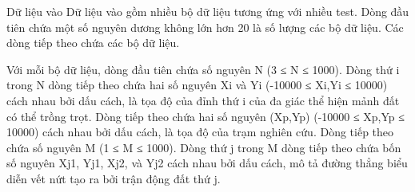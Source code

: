 Dữ liệu vào
Dữ liệu vào gồm nhiều bộ dữ liệu tương ứng với nhiều test. Dòng đầu tiên chứa một số nguyên dương không lớn hơn 20 là số lượng các bộ dữ liệu. Các dòng tiếp theo chứa các bộ dữ liệu.  

   Với mỗi bộ dữ liệu, dòng đầu tiên chứa số nguyên N (3 ≤  N ≤  1000). Dòng thứ i trong N dòng tiếp theo chứa hai số nguyên Xi và Yi (-10000 ≤ Xi,Yi ≤ 10000) cách nhau bởi dấu cách, là tọa độ của đỉnh thứ i của đa giác thể hiện mảnh đất có thể trồng trọt. Dòng tiếp theo chứa hai số nguyên (Xp,Yp) (-10000 ≤ Xp,Yp ≤ 10000) cách nhau bởi dấu cách, là tọa độ của trạm nghiên cứu. Dòng tiếp theo chứa số nguyên M (1 ≤ M ≤ 1000). Dòng thứ j trong M dòng tiếp theo chứa bốn số nguyên Xj1, Yj1, Xj2, và Yj2 cách nhau bởi dấu cách, mô tả đường thẳng biểu diễn vết nứt tạo ra bởi trận động đất thứ j.